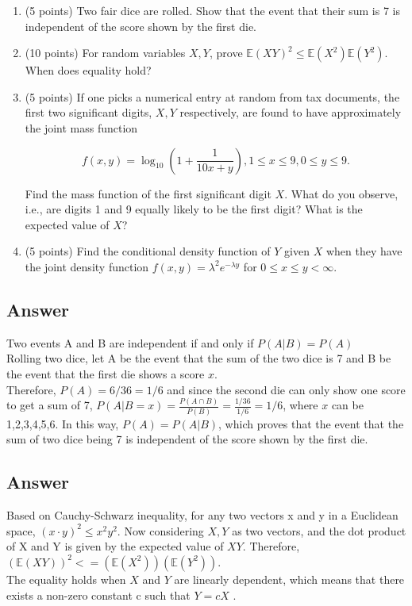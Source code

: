 \begin{tcolorbox}
	\begin{enumerate}
		\item  (5 points)  Two fair dice are rolled. Show that the event that their sum is 7 is independent of the score shown by the first die.  
         \item  (10 points)    For random variables $X,Y$, prove $\mathbb{E}(XY)^2 \leq \mathbb{E}(X^2)\mathbb{E}(Y^2)$. When does equality hold?
    
         \item  (5 points)   If one picks a numerical entry at random from tax documents, the first two significant digits, $X, Y$ respectively, are found to have approximately the joint mass function 

         $$ f(x,y) = \log_{10}(1+\frac{1}{10x+y}), 1\leq x\leq 9, 0\leq y\leq 9.$$

         Find the mass function of the first significant digit $X$. What do you observe, i.e., are digits 1 and 9 equally likely to be the first digit? What is the expected value of $X$?  

         \item  (5 points)  Find the conditional density function  of $Y$ given $X$ when they have the joint density function $f(x,y)=\lambda^2 e^{-\lambda y}$ for $0\leq x \leq y<\infty$. 
	\end{enumerate}
\end{tcolorbox}

 \subsection{Answer}
 Two events A and B are independent if and only if $P(A|B) = P(A)$\\
 Rolling two dice, let A be the event that the sum of the two dice is 7 and
 B be the event that the first die shows a score $x$. \\
 Therefore, $P(A) = 6/36 = 1/6$ and since the second die can only show one score to get a sum of 7,
 $P(A \vert B = x) = \frac{P(A\cap B)}{P(B)} = \frac{1/36}{1/6} =1/6$, where $x$ can be 1,2,3,4,5,6.
 In this way, $P(A) = P(A \vert B)$, which proves that the event that the sum of two dice being 7 is
 independent of the score shown by the first die.

 \subsection{Answer}
 Based on Cauchy-Schwarz inequality, for any two vectors x and y in a Euclidean space,
 $(x\cdot y)^2 \leq x^2 y^2$. Now considering $X, Y$ as two vectors, 
 and the dot product of X and Y is given by the expected value of $XY$. Therefore,
 $(\mathbb{E}(XY))^2 <= (\mathbb{E}(X^2))(\mathbb{E}(Y^2))$. \\
 The equality holds when $X$ and $Y$ are linearly dependent, 
 which means that there exists a non-zero constant c such that $Y = cX$ .

